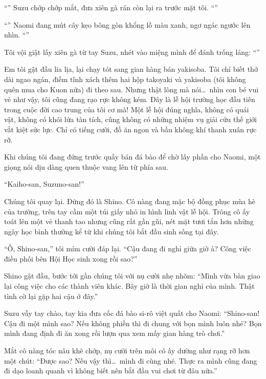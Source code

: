 \documentclass[../main.tex]{subfiles}
\begin{document}
``'' Suzu chớp chớp mắt, đưa xiên gà rán còn lại ra trước mặt tôi. ``''

``'' Naomi đang mút cây kẹo bông gòn khổng lồ màu xanh, ngơ ngác ngước lên nhìn. ``''

Tôi vội giật lấy xiên gà từ tay Suzu, nhét vào miệng mình để đánh trống lảng: ``''

Em tôi gật đầu lia lịa, lại chạy tót sang gian hàng bán yakisoba. Tôi chỉ biết thở dài ngao ngán, điềm tĩnh xách thêm hai hộp takoyaki và yakisoba (tôi không quên mua cho Kuon nữa) đi theo sau. Nhưng thật lòng mà nói\dots\ nhìn con bé vui vẻ như vậy, tôi cũng đang rạo rực không kém. Đây là lễ hội trường học đầu tiên trong cuộc đời cao trung của tôi cơ mà! Một lễ hội đúng nghĩa, không có quái vật, không có khói lửa tàn tích, cũng không có những nhiệm vụ giải cứu thế giới vắt kiệt sức lực. Chỉ có tiếng cười, đồ ăn ngon và bầu không khí thanh xuân rực rỡ.

Khi chúng tôi đang đứng trước quầy bán đá bào để chờ lấy phần cho Naomi, một giọng nói dịu dàng quen thuộc vang lên từ phía sau.

``Kaiho-san, Suzuno-san!''

Chúng tôi quay lại. Đứng đó là Shino. Cô nàng đang mặc bộ đồng phục mùa hè của trường, trên tay cầm một túi giấy nhỏ in hình linh vật lễ hội. Trông cô ấy toát lên một vẻ thanh tao nhưng cũng rất gần gũi, nét mặt tươi tắn hơn những ngày học bình thường kể từ khi chúng tôi bắt đầu sinh sống tại đây.

``Ồ, Shino-san,'' tôi mỉm cười đáp lại. ``Cậu đang đi nghỉ giữa giờ à? Công việc điều phối bên Hội Học sinh xong rồi sao?''

Shino gật đầu, bước tới gần chúng tôi với nụ cười nhẹ nhõm: ``Mình vừa bàn giao lại công việc cho các thành viên khác. Bây giờ là thời gian nghỉ của mình. Thật tình cờ lại gặp hai cậu ở đây.''

Suzu vẫy tay chào, tay kia đưa cốc đá bào si-rô việt quất cho Naomi: ``Shino-san! Cậu đi một mình sao? Nếu không phiền thì đi chung với bọn mình luôn nhé? Bọn mình đang định đi ăn xong rồi lượn qua xem mấy gian hàng trò chơi.''

Mắt cô nàng tóc nâu khẽ chớp, nụ cười trên môi cô ấy dường như rạng rỡ hơn một chút: ``Được sao? Nếu vậy thì\dots\ mình đi cùng nhé. Thực ra mình cũng đang đi dạo loanh quanh vì không biết nên bắt đầu vui chơi từ đâu nữa.''
\end{document}
